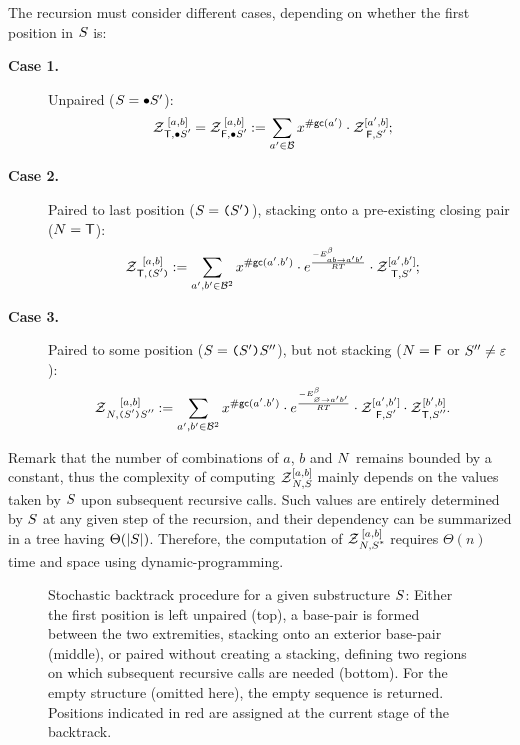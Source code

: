 The recursion must consider different cases, depending on whether the first position in $\Struct$ is:
\begin{description}
\item[{\bf Case 1.}] Unpaired ($\Struct = \ub \Struct'$):
\begin{align}
	\Z{\BoolTrue,\ub \Struct'}{a,b} = \Z{\BoolFalse,\ub \Struct'}{a,b}  &:=
      \sum_{a'\in \B}  
      x^{\gc(a')}
      \cdot\Z{\BoolFalse,\Struct'}{a',b}; 
\label{eq:Z_unpaired}
\end{align}
\item[{\bf Case 2.}] Paired to last position ($\Struct = \op \Struct' \cp$), stacking onto a pre-existing closing pair ($\N=\BoolTrue$):
\begin{align}
	\Z{\BoolTrue,\op \Struct' \cp}{a,b} &:=
      \sum_{a',b'\in \B^2}
			 x^{\gc(a'.b')}
			 \cdot e^{\frac{-\ES^{\beta}_{ab \to a'b'}}{RT}}
			 \cdot \Z{\BoolTrue,\Struct'}{a',b'};
\label{eq:Z_stack}
\end{align}
\item[{\bf Case 3.}] Paired to some position ($\Struct = \op \Struct' \cp \Struct''$), but not stacking ($\N=\BoolFalse$ or $\Struct''\neq \varepsilon$):
\begin{align}
	\Z{\N,\op \Struct' \cp \Struct''}{a,b} &:=
			 \displaystyle
      \sum_{a',b'\in \B^2}
      x^{\gc(a'.b')}
			\cdot e^{\frac{-\ES^{\beta}_{\varnothing\to a'b'}}{RT}}
      \cdot\Z{\BoolFalse,\Struct'}{a',b'}
      \cdot\Z{\BoolTrue,\Struct''}{b',b}.
\label{eq:Z_rec}
\end{align}
\end{description}

Remark that the number of combinations of $a$, $b$ and $\N$ remains bounded by a constant, thus the complexity of computing $\Z{\N,\Struct}{a,b}$ mainly depends on the values taken by $\Struct$ upon subsequent recursive calls. Such values are entirely determined by $\Struct$ at any given step of the recursion, and their dependency can be summarized in a tree having $\Theta(|\Struct|)$. Therefore, the computation of $\Z{\N,\Target}{a,b}$ requires $\Theta(n)$ time and space using dynamic-programming.

\begin{figure}
\resizebox{\textwidth}{!}{}
\caption{Stochastic backtrack procedure for a given substructure $\Struct$: Either the first position is left unpaired (top), a base-pair is formed between the two extremities, stacking onto an exterior base-pair (middle), or paired without creating a stacking, defining two regions on which subsequent recursive calls are needed (bottom). For the empty structure (omitted here), the empty sequence is returned. Positions indicated in red are assigned at the current stage of the backtrack.\label{fig:stochastic}}
\end{figure}


